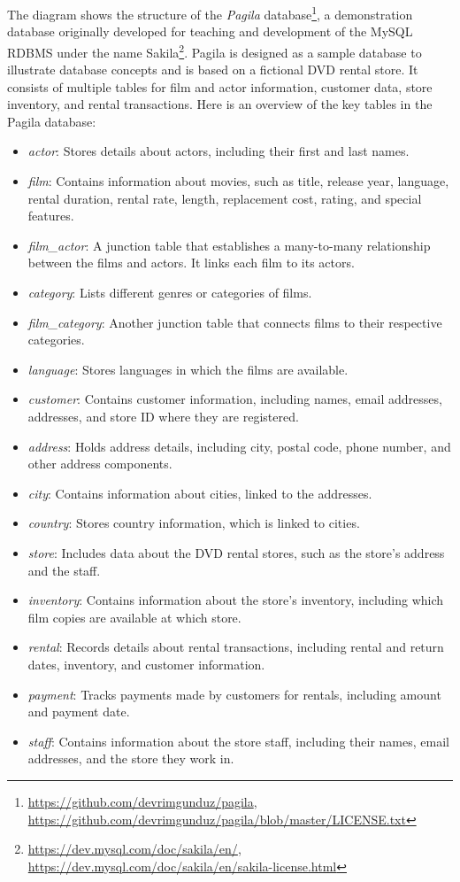 The diagram shows the structure of the \emph{Pagila} database\footnote{\url{https://github.com/devrimgunduz/pagila}, \\
\url{https://github.com/devrimgunduz/pagila/blob/master/LICENSE.txt}}, a demonstration database originally developed for teaching and development of the MySQL RDBMS under the name Sakila\footnote{\url{https://dev.mysql.com/doc/sakila/en/}, \\
\url{https://dev.mysql.com/doc/sakila/en/sakila-license.html}}. Pagila is designed as a sample database to illustrate database concepts and is based on a fictional DVD rental store. It consists of multiple tables for film and actor information, customer data, store inventory, and rental transactions. Here is an overview of the key tables in the Pagila database:

\begin{itemize}
  \item \emph{actor}: Stores details about actors, including their first and last names.
  \item \emph{film}: Contains information about movies, such as title, release year, language, rental duration, rental rate, length, replacement cost, rating, and special features.
  \item \emph{film\_actor}: A junction table that establishes a many-to-many relationship between the films and actors. It links each film to its actors.
  \item \emph{category}: Lists different genres or categories of films.
  \item \emph{film\_category}: Another junction table that connects films to their respective categories.
  \item \emph{language}: Stores languages in which the films are available.
  \item \emph{customer}: Contains customer information, including names, email addresses, addresses, and store ID where they are registered.
  \item \emph{address}: Holds address details, including city, postal code, phone number, and other address components.
  \item \emph{city}: Contains information about cities, linked to the addresses.
  \item \emph{country}: Stores country information, which is linked to cities.
  \item \emph{store}: Includes data about the DVD rental stores, such as the store's address and the staff.
  \item \emph{inventory}: Contains information about the store's inventory, including which film copies are available at which store.
  \item \emph{rental}: Records details about rental transactions, including rental and return dates, inventory, and customer information.
  \item \emph{payment}: Tracks payments made by customers for rentals, including amount and payment date.
  \item \emph{staff}: Contains information about the store staff, including their names, email addresses, and the store they work in.
\end{itemize}


